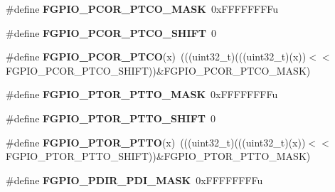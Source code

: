 \begin{DoxyCompactItemize}
\item 
\mbox{\label{group___f_g_p_i_o___register___masks_ga07265e812fba9f953394d6e9dfe82aab}} 
\#define {\bfseries F\+G\+P\+I\+O\+\_\+\+P\+C\+O\+R\+\_\+\+P\+T\+C\+O\+\_\+\+M\+A\+SK}~0x\+F\+F\+F\+F\+F\+F\+F\+Fu
\item 
\mbox{\label{group___f_g_p_i_o___register___masks_gaa72cbc41d1494dfea7662eede74ee2a1}} 
\#define {\bfseries F\+G\+P\+I\+O\+\_\+\+P\+C\+O\+R\+\_\+\+P\+T\+C\+O\+\_\+\+S\+H\+I\+FT}~0
\item 
\mbox{\label{group___f_g_p_i_o___register___masks_ga3e6a01871116d6b24b154bd78ff62963}} 
\#define {\bfseries F\+G\+P\+I\+O\+\_\+\+P\+C\+O\+R\+\_\+\+P\+T\+CO}(x)~(((uint32\+\_\+t)(((uint32\+\_\+t)(x))$<$$<$F\+G\+P\+I\+O\+\_\+\+P\+C\+O\+R\+\_\+\+P\+T\+C\+O\+\_\+\+S\+H\+I\+FT))\&F\+G\+P\+I\+O\+\_\+\+P\+C\+O\+R\+\_\+\+P\+T\+C\+O\+\_\+\+M\+A\+SK)
\item 
\mbox{\label{group___f_g_p_i_o___register___masks_gab0e5427135589fc107fe4b465e5c767f}} 
\#define {\bfseries F\+G\+P\+I\+O\+\_\+\+P\+T\+O\+R\+\_\+\+P\+T\+T\+O\+\_\+\+M\+A\+SK}~0x\+F\+F\+F\+F\+F\+F\+F\+Fu
\item 
\mbox{\label{group___f_g_p_i_o___register___masks_gae2127729a1021dc8d34d55a758102213}} 
\#define {\bfseries F\+G\+P\+I\+O\+\_\+\+P\+T\+O\+R\+\_\+\+P\+T\+T\+O\+\_\+\+S\+H\+I\+FT}~0
\item 
\mbox{\label{group___f_g_p_i_o___register___masks_gad88e5aa39295cd2c0d225f417f6c741a}} 
\#define {\bfseries F\+G\+P\+I\+O\+\_\+\+P\+T\+O\+R\+\_\+\+P\+T\+TO}(x)~(((uint32\+\_\+t)(((uint32\+\_\+t)(x))$<$$<$F\+G\+P\+I\+O\+\_\+\+P\+T\+O\+R\+\_\+\+P\+T\+T\+O\+\_\+\+S\+H\+I\+FT))\&F\+G\+P\+I\+O\+\_\+\+P\+T\+O\+R\+\_\+\+P\+T\+T\+O\+\_\+\+M\+A\+SK)
\item 
\mbox{\label{group___f_g_p_i_o___register___masks_ga49077fe6b4cbd499bfa84f4b4c1be74c}} 
\#define {\bfseries F\+G\+P\+I\+O\+\_\+\+P\+D\+I\+R\+\_\+\+P\+D\+I\+\_\+\+M\+A\+SK}~0x\+F\+F\+F\+F\+F\+F\+F\+Fu
\item 

\end{DoxyCompactItemize}
